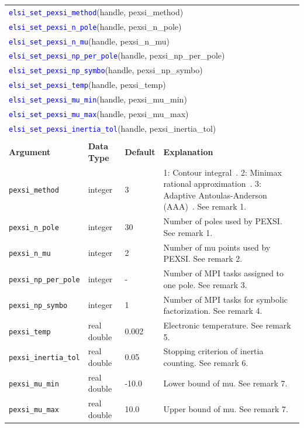 \documentclass{report}
\newcommand{\api}[1]{\textcolor{blue}{\texttt{#1}}}
\begin{document}
\begin{tabular}[]{|p{30mm}|p{20mm}|p{15mm}|p{97mm}|}
\multicolumn{4}{l}{\api{elsi\_set\_pexsi\_method}(handle, pexsi\_method)}\\
\multicolumn{4}{l}{\api{elsi\_set\_pexsi\_n\_pole}(handle, pexsi\_n\_pole)}\\
\multicolumn{4}{l}{\api{elsi\_set\_pexsi\_n\_mu}(handle, pexsi\_n\_mu)}\\
\multicolumn{4}{l}{\api{elsi\_set\_pexsi\_np\_per\_pole}(handle, pexsi\_np\_per\_pole)}\\
\multicolumn{4}{l}{\api{elsi\_set\_pexsi\_np\_symbo}(handle, pexsi\_np\_symbo)}\\
\multicolumn{4}{l}{\api{elsi\_set\_pexsi\_temp}(handle, pexsi\_temp)}\\
\multicolumn{4}{l}{\api{elsi\_set\_pexsi\_mu\_min}(handle, pexsi\_mu\_min)}\\
\multicolumn{4}{l}{\api{elsi\_set\_pexsi\_mu\_max}(handle, pexsi\_mu\_max)}\\
\multicolumn{4}{l}{\api{elsi\_set\_pexsi\_inertia\_tol}(handle, pexsi\_inertia\_tol)}\\
\multicolumn{4}{l}{}\\
\hline
\multicolumn{1}{|l|}{\textbf{Argument}} & \multicolumn{1}{l|}{\textbf{Data Type}} & \multicolumn{1}{l|}{\textbf{Default}} & \multicolumn{1}{l|}{\textbf{Explanation}}\\
\hline
\texttt{pexsi\_method}        & integer     & 3     & 1: Contour integral~\cite{pexsi_lin_2013}. 2: Minimax rational approximation~\cite{pole_moussa_2016}. 3: Adaptive Antoulas-Anderson (AAA)~\cite{aaa_nakatsukasa_2018}. See remark 1.\\
\hline
\texttt{pexsi\_n\_pole}       & integer     & 30    & Number of poles used by PEXSI. See remark 1.\\
\hline
\texttt{pexsi\_n\_mu}         & integer     & 2     & Number of mu points used by PEXSI. See remark 2.\\
\hline
\texttt{pexsi\_np\_per\_pole} & integer     & -     & Number of MPI tasks assigned to one pole. See remark 3.\\
\hline
\texttt{pexsi\_np\_symbo}     & integer     & 1     & Number of MPI tasks for symbolic factorization. See remark 4.\\
\hline
\texttt{pexsi\_temp}          & real double & 0.002 & Electronic temperature. See remark 5.\\
\hline
\texttt{pexsi\_inertia\_tol}  & real double & 0.05  & Stopping criterion of inertia counting. See remark 6.\\
\hline
\texttt{pexsi\_mu\_min}       & real double & -10.0 & Lower bound of mu. See remark 7.\\
\hline
\texttt{pexsi\_mu\_max}       & real double & 10.0  & Upper bound of mu. See remark 7.\\
\hline
\end{tabular}
\end{document}
